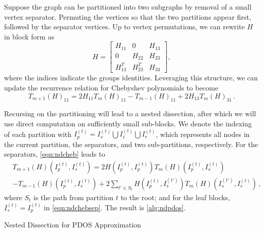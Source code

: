 Suppose the graph can be partitioned into two subgraphs by removal of a small
vertex separator.  Permuting the vertices so that the two partitions appear
first, followed by the separator vertices. Up to vertex permutations, we can
rewrite $H$ in block form as
\begin{equation}\label{eqn:dissection}
	H = \begin{bmatrix}
	H_{11} & 0 & H_{13}\\
	0 & H_{22} & H_{23}\\
	H_{13}^T & H_{23}^T & H_{33}
	\end{bmatrix},
\end{equation}
where the indices indicate the groups identities. Leveraging this structure, we
can update the recurrence relation for Chebyshev polynomials to become
\begin{equation}\label{eqn:ndcheb}
	T_{m+1}(H)_{11} = 2H_{11}T_m(H)_{11} - T_{m-1}(H)_{11} + 2H_{13}T_m(H)_{31}\,.
\end{equation}

Recursing on the partitioning will lead to a nested dissection, after which we
will use direct computation on sufficiently small sub-blocks. We denote the
indexing of each partition with $I^{(t)}_p = I^{(t)}_s\bigcup I^{
(t)}_\ell\bigcup I^{(t)}_r$, which represents all nodes in the current
partition, the separators, and two sub-partitions, respectively. For the
separators, \cref{eqn:ndcheb} leads to
\begin{align}\label{eqn:ndchebsep}
	&T_{m+1}(H)(I^{(t)}_p,I^{(t)}_s) = 2H(I^{(t)}_p, I^{(t)}_p)T_m(H)(I^{(t)}_p,
	I^{(t)}_s) \nonumber\\
	&-T_{m-1}(H)(I^{(t)}_p,I^{(t)}_s) + 2\sum_{t'\in S_t}H(I^{(t)}_p,I^{(t')}_s)
	T_m(H)(I^{(t')}_s, I^{(t)}_s)\,,
\end{align}
where $S_t$ is the path from partition $t$ to the root; and for the leaf
blocks, $I^{(t)}_s = I^{(t)}_p$ in \cref{eqn:ndchebsep}. The result is 
\cref{alg:ndpdos}.

\begin{algorithm}
	\DontPrintSemicolon
	\caption{Nested Dissection for PDOS Approximation}
	\label{alg:ndpdos}        
\end{algorithm}

